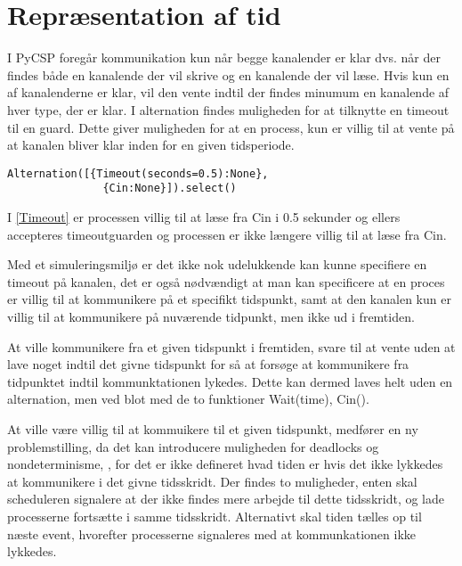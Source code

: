 \section{Repræsentation af tid}
I PyCSP foregår kommunikation kun når begge kanalender er klar dvs.
når der findes både en kanalende der vil skrive og en kanalende der vil læse. 
Hvis kun en af kanalenderne er klar, vil den vente indtil
der findes minumum en kanalende af hver type, der er klar. I alternation 
findes muligheden for at tilknytte en timeout til en guard. Dette
giver muligheden for at en process, kun er villig til at vente på at kanalen 
bliver klar inden for en given tidsperiode. 
\begin{lstlisting}[float=hbtp, label=Timeout,
  caption=Timeout i Alternation (fra dokumentationen til PyCSP)]
  Alternation([{Timeout(seconds=0.5):None},
               {Cin:None}]).select()
\end{lstlisting} 

I \autoref{Timeout} er processen villig til at læse fra Cin i 0.5 sekunder og ellers accepteres timeoutguarden og processen er ikke længere villig til at læse fra Cin.

Med et simuleringsmiljø er det ikke nok udelukkende kan kunne specifiere en 
timeout på kanalen, det er også nødvændigt at man kan specificere at en proces 
er villig til at kommunikere på et specifikt tidspunkt, samt at den kanalen 
kun er villig til at kommunikere på nuværende tidpunkt, men ikke ud 
i fremtiden. 

At ville kommunikere fra et given tidspunkt i fremtiden,  svare til at vente 
uden at lave noget indtil det givne tidspunkt for så at forsøge at kommunikere 
fra tidpunktet indtil kommunktationen lykedes. Dette kan dermed laves helt 
uden en alternation, men ved blot med de to funktioner Wait(time), Cin(). 

At ville være villig til at kommuikere til et given tidspunkt, medfører en ny 
problemstilling, da det kan introducere muligheden for deadlocks og 
nondeterminisme, , for det er ikke defineret hvad 
tiden er hvis det ikke lykkedes at kommunikere i det givne tidsskridt. Der 
findes to muligheder, enten skal scheduleren signalere at der ikke findes mere 
arbejde til dette tidsskridt, og lade processerne fortsætte i samme 
tidsskridt. Alternativt skal tiden tælles op til næste event, hvorefter 
processerne signaleres med at kommunkationen ikke lykkedes. 

